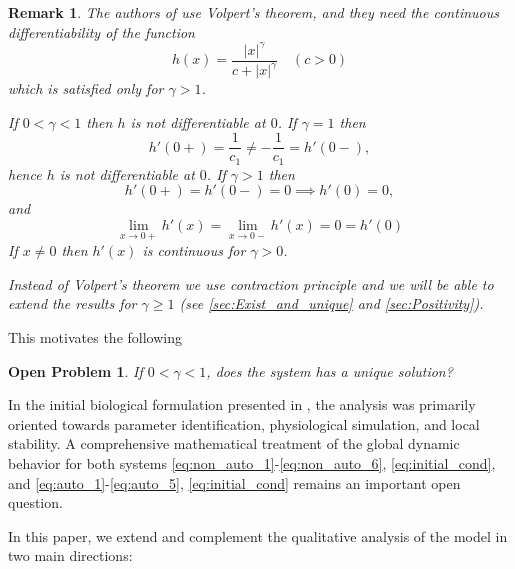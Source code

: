 \documentclass[pdflatex,sn-mathphys-num]{sn-jnl}
\theoremstyle{thmstyleone}
\theoremstyle{thmstyletwo}
\theoremstyle{thmstylethree}
\newtheorem{remark}{Remark}[section]
\newtheorem{openproblem}{Open Problem}[section]
\begin{document}
\begin{remark}\label{rem:frac_gamma}
The authors of \cite{degaetano2024} use Volpert's theorem, and they need the continuous 
differentiability of the function 
\begin{equation}
    h(x)=\frac{|x|^{\gamma}}{c+|x|^{\gamma}}\quad (c>0)
\end{equation}
which is satisfied only for $\gamma >1$.

If $0<\gamma<1$ then $h$ is not differentiable at $0$. If $\gamma=1$ then 
\begin{equation*}
    h'(0+)=\frac{1}{c_1}\neq -\frac{1}{c_1}=h'(0-),
\end{equation*}
hence $h$ is not differentiable at $0$. If $\gamma>1$ then 
\begin{equation*}
    h'(0+)=h'(0-)=0 \implies h'(0)=0,
\end{equation*}
and
\begin{equation*}
    \lim_{x\to 0+} h'(x)=\lim_{x\to 0-} h'(x)=0=h'(0)
\end{equation*}
If $x\neq 0$ then $h'(x)$ is continuous for $\gamma >0$. 

Instead of Volpert's theorem we use contraction principle and we will be able to extend 
the results for $\gamma\geq 1$ (see \autoref{sec:Exist_and_unique} and \autoref{sec:Positivity}).   
\end{remark}
This motivates the following 
\begin{openproblem}
    If $0 < \gamma < 1$, does the system has a unique solution?
\end{openproblem}

In the initial biological formulation presented in \cite{degaetano2024}, the analysis was 
primarily oriented towards parameter identification, physiological simulation, and local 
stability. A comprehensive mathematical treatment of the global dynamic behavior for both systems 
\eqref{eq:non_auto_1}-\eqref{eq:non_auto_6}, \eqref{eq:initial_cond}, 
and \eqref{eq:auto_1}-\eqref{eq:auto_5}, \eqref{eq:initial_cond}  
remains an important open question.

In this paper, we extend and complement the qualitative analysis of the model in two main 
directions:
\end{document}
